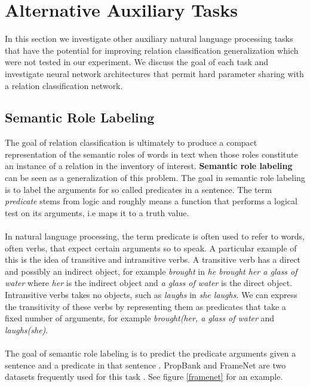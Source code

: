 \section{Alternative Auxiliary Tasks}
In this section we investigate other auxiliary natural language processing tasks that have the potential for improving relation classification generalization which were not tested in our experiment. We discuss the goal of each task and investigate neural network architectures that permit hard parameter sharing with a relation classification network.

\subsection{Semantic Role Labeling}
The goal of relation classification is ultimately to produce a compact representation of the semantic roles of words in text when those roles constitute an instance of a relation in the inventory of interest. \textbf{Semantic role labeling} can be seen as a generalization of this problem. The goal in semantic role labeling is to label the arguments for so called predicates in a sentence. The term \textit{predicate} stems from logic and roughly means a function that performs a logical test on its arguments, i.e maps it to a truth value. 
\\\\
In natural language processing, the term predicate is often used to refer to words, often verbs, that expect certain arguments so to speak. A particular example of this is the idea of transitive and intransitive verbs. A transitive verb has a direct and possibly an indirect object, for example \textit{brought} in \textit{he brought her a glass of water} where \textit{her} is the indirect object and \textit{a glass of water} is the direct object. Intransitive verbs takes no objects, such as \textit{laughs} in \textit{she laughs}. We can express the transitivity of these verbs by representing them as predicates that take a fixed number of arguments, for example \textit{brought(her, a glass of water} and \textit{laughs(she)}.
\\\\
The goal of semantic role labeling is to predict the predicate arguments given a sentence and a predicate in that sentence \citep{jurafsky09}. PropBank and FrameNet are two datasets frequently used for this task \citep{kingsbury2002, baker1998}. See figure \ref{framenet} for an example.

